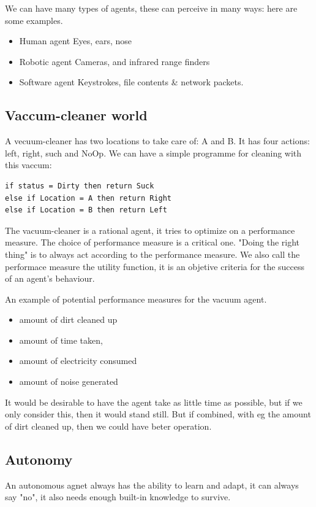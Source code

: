 \documentclass{article}
\begin{document}
We can have many types of agents, these can perceive in many ways: here are some
examples.
\begin{itemize}
  \item Human agent
    \subitem Eyes, ears, nose
  \item Robotic agent
    \subitem Cameras, and infrared range finders
  \item Software agent
    \subitem Keystrokes, file contents \& network packets.
\end{itemize}

\subsection{Vaccum-cleaner world}%
\label{sub:vaccum_cleaner_world}
A vecuum-cleaner has two locations to take care of: A and B. It has four
actions: left, right, such and NoOp. We can have a simple programme for cleaning
with this vaccum:

\begin{lstlisting}
if status = Dirty then return Suck
else if Location = A then return Right
else if Location = B then return Left
\end{lstlisting}

The vacuum-cleaner is a rational agent, it tries to optimize on a performance
measure. The choice of performance measure is a critical one. "Doing the right
thing" is to always act according to the performance measure. We also call the
performace measure the utility function, it is an objetive criteria for the
success of an agent's behaviour.

An example of potential performance measures for the vacuum agent.
\begin{itemize}
  \item amount of dirt cleaned up
  \item amount of time taken,
  \item amount of electricity consumed
  \item amount of noise generated
\end{itemize}
It would be desirable to have the agent take as little time as possible, but if
we only consider this, then it would stand still. But if combined, with eg the
amount of dirt cleaned up, then we could have beter operation.

\subsection{Autonomy}%
\label{sub:autonomy}
An autonomous agnet always has the ability to learn and adapt, it can always say
"no", it also needs enough built-in knowledge to survive.
\end{document}
